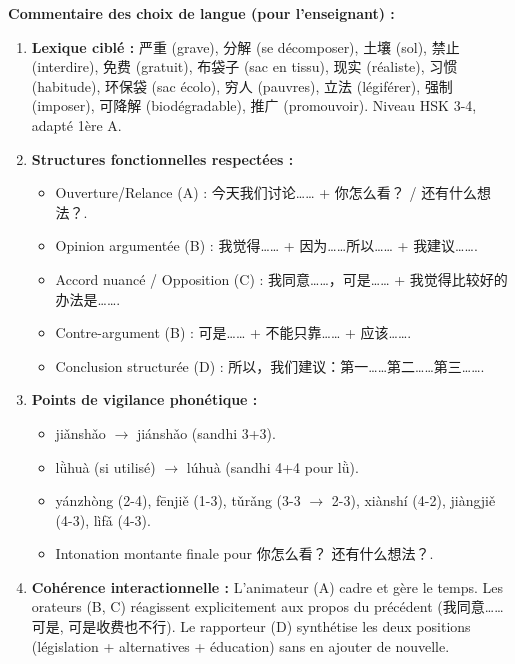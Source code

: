 \documentclass[11pt]{article}
\newcommand{\cle}[1]{{\popxbold\color{popdark}#1}}
\begin{document}
\noindent\textbf{Commentaire des choix de langue (pour l'enseignant) :}
\begin{enumerate}
    \item \textbf{Lexique ciblé :} \cle{严重} (grave), \cle{分解} (se décomposer), \cle{土壤} (sol), \cle{禁止} (interdire), \cle{免费} (gratuit), \cle{布袋子} (sac en tissu), \cle{现实} (réaliste), \cle{习惯} (habitude), \cle{环保袋} (sac écolo), \cle{穷人} (pauvres), \cle{立法} (légiférer), \cle{强制} (imposer), \cle{可降解} (biodégradable), \cle{推广} (promouvoir). Niveau HSK 3-4, adapté 1ère A.
    \item \textbf{Structures fonctionnelles respectées :}
    \begin{itemize}
        \item Ouverture/Relance (A) : \cle{今天我们讨论……} + \cle{你怎么看？} / \cle{还有什么想法？}.
        \item Opinion argumentée (B) : \cle{我觉得……} + \cle{因为……所以……} + \cle{我建议……}.
        \item Accord nuancé / Opposition (C) : \cle{我同意……，可是……} + \cle{我觉得比较好的办法是……}.
        \item Contre-argument (B) : \cle{可是……} + \cle{不能只靠……} + \cle{应该……}.
        \item Conclusion structurée (D) : \cle{所以，我们建议：第一……第二……第三……}.
    \end{itemize}
    \item \textbf{Points de vigilance phonétique :}
    \begin{itemize}
        \item \cle{jiǎnshǎo} $\rightarrow$ \cle{jiánshǎo} (sandhi 3+3).
        \item \cle{lǜhuà} (si utilisé) $\rightarrow$ \cle{lúhuà} (sandhi 4+4 pour \cle{lǜ}).
        \item \cle{yánzhòng} (2-4), \cle{fēnjiě} (1-3), \cle{tǔrǎng} (3-3 $\rightarrow$ 2-3), \cle{xiànshí} (4-2), \cle{jiàngjiě} (4-3), \cle{lìfǎ} (4-3).
        \item Intonation montante finale pour \cle{你怎么看？} \cle{还有什么想法？}.
    \end{itemize}
    \item \textbf{Cohérence interactionnelle :} L'animateur (A) cadre et gère le temps. Les orateurs (B, C) réagissent explicitement aux propos du précédent (\cle{我同意……可是}, \cle{可是收费也不行}). Le rapporteur (D) synthétise les deux positions (législation + alternatives + éducation) sans en ajouter de nouvelle.
\end{enumerate}
\end{document}
